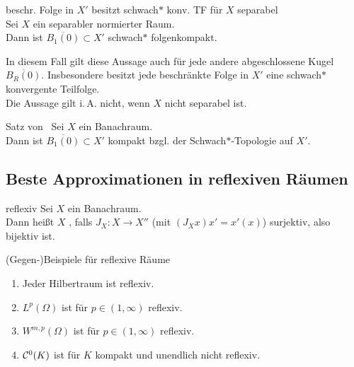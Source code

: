 \linie

\begin{Satz}{beschr. Folge in $X'$ besitzt schwach$\ast$ konv. TF für $X$ separabel}\\
    Sei $X$ ein separabler normierter Raum.\\
    Dann ist $\overline{B_1(0)} \subset X'$ schwach$\ast$ folgenkompakt.
\end{Satz}

\begin{Bem}
    In diesem Fall gilt diese Aussage auch für jede andere abgeschlossene Kugel
    $\overline{B_R(0)}$.
    Insbesondere besitzt jede beschränkte Folge in $X'$ eine schwach$\ast$ konvergente Teilfolge.\\
    Die Aussage gilt i.\,A. nicht, wenn $X$ nicht separabel ist.
\end{Bem}

\begin{Satz}{Satz von \scshape\,\!}
    Sei $X$ ein Banachraum.\\
    Dann ist $\overline{B_1(0)} \subset X'$ kompakt bzgl. der Schwach$\ast$-Topologie auf $X'$.
\end{Satz}

\pagebreak

\subsection{%
    Beste Approximationen in reflexiven Räumen%
}

\begin{Def}{reflexiv}
    Sei $X$ ein Banachraum.\\
    Dann heißt $X$ , falls $J_X\colon X \rightarrow X''$
    (mit $(J_X x)x' = x'(x)$) surjektiv, also bijektiv ist.
\end{Def}

\begin{Satz}{(Gegen-)Beispiele für reflexive Räume}
    \begin{enumerate}
        \item
        Jeder Hilbertraum ist reflexiv.

        \item
        $L^p(\Omega)$ ist für $p \in (1, \infty)$ reflexiv.

        \item
        $W^{m,p}(\Omega)$ ist für $p \in (1, \infty)$ reflexiv.

        \item
        $\mathcal{C}^0(K)$ ist für $K$ kompakt und unendlich nicht reflexiv.
    \end{enumerate}
\end{Satz}

